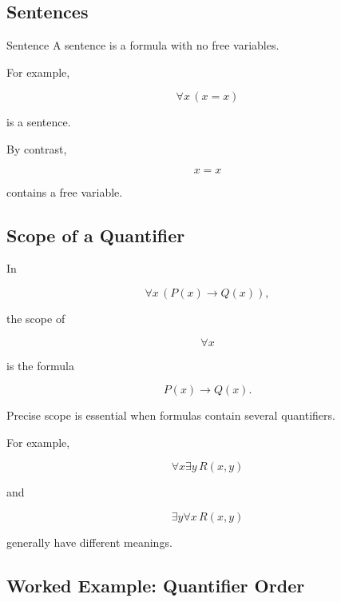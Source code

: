 \subsection{Sentences}
\label{subsec:first-order-sentences}

\begin{definitionbox}{Sentence}
A sentence is a formula with no free variables.
\end{definitionbox}

For example,

\[
\boxed{
\forall x
\,
(x=x)
}
\]

is a sentence.

By contrast,

\[
\boxed{
x=x
}
\]

contains a free variable.

\subsection{Scope of a Quantifier}
\label{subsec:quantifier-scope}

In

\[
\forall x
\,
(P(x)\rightarrow Q(x)),
\]

the scope of

\[
\forall x
\]

is the formula

\[
P(x)\rightarrow Q(x).
\]

Precise scope is essential when formulas contain several quantifiers.

For example,

\[
\forall x\exists y\,R(x,y)
\]

and

\[
\exists y\forall x\,R(x,y)
\]

generally have different meanings.

\subsection{Worked Example: Quantifier Order}
\label{subsec:worked-quantifier-order}

